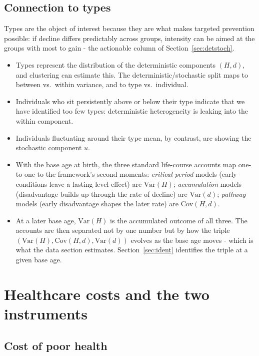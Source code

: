 \documentclass[11pt]{article}
\theoremstyle{remark}
\newcommand{\Var}{\mathrm{Var}}
\newcommand{\Cov}{\mathrm{Cov}}
\begin{document}
\subsection{Connection to types}

Types are the object of interest because they are what makes targeted prevention possible: if decline differs predictably across groups, intensity can be aimed at the groups with most to gain - the actionable column of Section~\ref{sec:detstoch}.

\begin{itemize}
\item Types represent the distribution of the deterministic components $(H,d)$, and clustering can estimate this.
The deterministic/stochastic split maps to between vs.\ within variance, and to type vs.\ individual.
\item Individuals who sit persistently above or below their type indicate that we have identified too few types: deterministic heterogeneity is leaking into the within component.
\item Individuals fluctuating around their type mean, by contrast, are showing the stochastic component $u$.
\item With the base age at birth, the three standard life-course accounts map one-to-one to the framework's second moments: \emph{critical-period} models (early conditions leave a lasting level effect) are $\Var(H)$; \emph{accumulation} models (disadvantage builds up through the rate of decline) are $\Var(d)$; \emph{pathway} models (early disadvantage shapes the later rate) are $\Cov(H,d)$.
\item At a later base age, $\Var(H)$ is the accumulated outcome of all three.
The accounts are then separated not by one number but by how the triple $(\Var(H),\Cov(H,d),\Var(d))$ evolves as the base age moves - which is what the data section estimates.
Section~\ref{sec:ident} identifies the triple at a given base age.
\end{itemize}

\section{Healthcare costs and the two instruments}\label{sec:cost}

\subsection{Cost of poor health}
\end{document}
